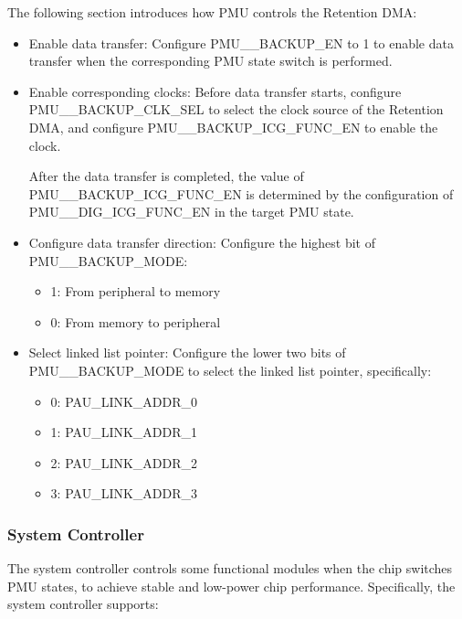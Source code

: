 \documentclass[main\_\_EN.tex]{subfiles}
\begin{document}
The following section introduces how PMU controls the Retention DMA:

\begin{itemize}
\item Enable data transfer: Configure PMU\_\_BACKUP\_EN to 1 to enable data transfer when the corresponding PMU state switch is performed.

\item Enable corresponding clocks: Before data transfer starts, configure PMU\_\_BACKUP\_CLK\_SEL to select the clock source of the Retention DMA, and configure PMU\_\_BACKUP\_ICG\_FUNC\_EN to enable the clock.

After the data transfer is completed, the value of PMU\_\_BACKUP\_ICG\_FUNC\_EN is determined by the configuration of PMU\_\_DIG\_ICG\_FUNC\_EN in the target PMU state.

\item Configure data transfer direction: Configure the highest bit of PMU\_\_BACKUP\_MODE:
    \begin{itemize}
        \item 1: From peripheral to memory
        \item 0: From memory to peripheral
    \end{itemize}

\item Select linked list pointer: Configure the lower two bits of PMU\_\_BACKUP\_MODE to select the linked list pointer, specifically:
    \begin{itemize}
    \item 0: PAU\_LINK\_ADDR\_0
    \item 1: PAU\_LINK\_ADDR\_1
    \item 2: PAU\_LINK\_ADDR\_2
    \item 3: PAU\_LINK\_ADDR\_3
    \end{itemize}
\end{itemize}

\subsubsection{System Controller}

The system controller controls some functional modules when the chip switches PMU states, to achieve stable and low-power chip performance. Specifically, the system controller supports:
\end{document}
